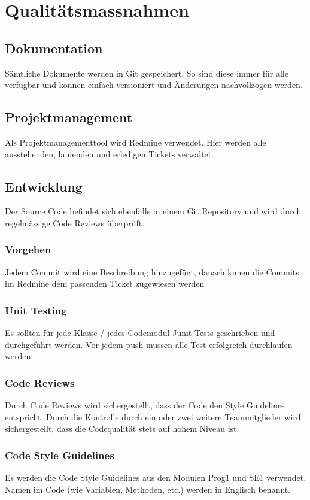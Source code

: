 \documentclass[11pt]{scrartcl}
\begin{document}
\section{Qualitätsmassnahmen}
\label{sec:Qualitätsmassnahmen}
\subsection{Dokumentation}
\label{sec:Dokumentation}
Sämtliche Dokumente werden in Git gespeichert. So sind diese immer für alle verfügbar und können einfach versioniert und Änderungen nachvollzogen werden.
\subsection{Projektmanagement}
\label{sec:Projektmanagement}
Als Projektmanagementtool wird Redmine verwendet. Hier werden alle ausstehenden, laufenden und erledigen Tickets verwaltet.
\subsection{Entwicklung}
\label{sec:Entwicklung}
Der Source Code befindet sich ebenfalls in einem Git Repository und wird durch regelmässige Code Reviews überprüft.
\subsubsection{Vorgehen}
\label{sec:Vorgehen}
Jedem Commit wird eine Beschreibung hinzugefügt, danach knnen die Commits im Redmine dem passenden Ticket zugewiesen werden
\subsubsection{Unit Testing}
\label{sec:Unit Tesing}
Es sollten für jede Klasse / jedes Codemodul Junit Tests geschrieben und durchgeführt werden. Vor jedem push müssen alle Test erfolgreich durchlaufen werden.
\subsubsection{Code Reviews}
\label{sec:Code Reviews}
Durch Code Reviews wird sichergestellt, dass der Code den Style Guidelines entspricht.
Durch die Kontrolle durch ein oder zwei weitere Teammitglieder wird sichergestellt, dass die Codequalität stets auf hohem Niveau ist.
\subsubsection{Code Style Guidelines}
\label{sec:Code Style Guidelines}
Es werden die Code Style Guidelines aus den Modulen Prog1 und SE1 verwendet. Namen im Code (wie Variablen, Methoden, etc.) werden in Englisch benannt.
\end{document}
